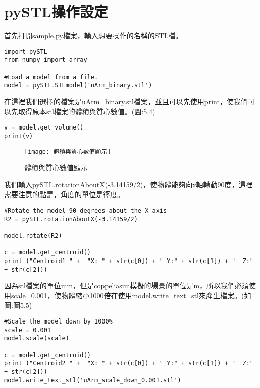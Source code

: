\section{ pySTL操作設定}
首先打開sample.py檔案，輸入想要操作的名稱的STL檔。\\

 \begin{lstlisting}[caption=\Large 輸入名稱]
import pySTL
from numpy import array

#Load a model from a file.
model = pySTL.STLmodel('uArm_binary.stl')

\end{lstlisting}

在這裡我們選擇的檔案是uArm\_binary.stl檔案，並且可以先使用print，使我們可以先取得原本stl檔案的體積與質心數值。(圖:5.4) \\

 \begin{lstlisting}[caption=\Large 數值]
v = model.get_volume()
print(v)

\end{lstlisting}


\begin{figure}[hbt!]
\begin{center}
\texttt{[image:  體積與質心數值顯示]}
\caption{\Large 體積與質心數值顯示}\label{ 體積與質心數值顯示}
\end{center}
\end{figure}

我們輸入pySTL.rotationAboutX(-3.14159/2)，使物體能夠向x軸轉動90度，這裡需要注意的點是，角度的單位是徑度。\\

 \begin{lstlisting}[caption=\Large 向X軸轉90度]
#Rotate the model 90 degrees about the X-axis
R2 = pySTL.rotationAboutX(-3.14159/2)

model.rotate(R2)

c = model.get_centroid()
print ("Centroid1 " +  "X: " + str(c[0]) + " Y:" + str(c[1]) + "  Z:" + str(c[2]))

\end{lstlisting}

因為stl檔案的單位mm，但是coppeliasim模擬的場景的單位是m，所以我們必須使用scale=0.001，使物體縮小1000倍在使用model.write\_text\_stl來產生檔案。(如圖:圖5.5)\\

 \begin{lstlisting}[caption=\Large 縮小1000倍]
#Scale the model down by 1000%
scale = 0.001
model.scale(scale)

c = model.get_centroid()
print ("Centroid2 " +  "X: " + str(c[0]) + " Y:" + str(c[1]) + "  Z:" + str(c[2]))
model.write_text_stl('uArm_scale_down_0.001.stl')

\end{lstlisting}

